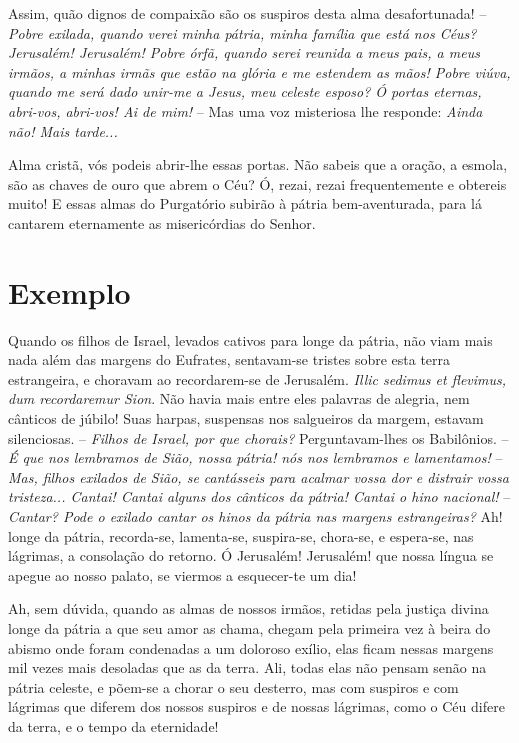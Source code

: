 Assim, quão dignos de compaixão são os suspiros desta alma desafortunada! – \textit{Pobre exilada, quando verei minha pátria, minha família que está nos Céus? Jerusalém! Jerusalém! Pobre órfã, quando serei reunida a meus pais, a meus irmãos, a minhas irmãs que estão na glória e me estendem as mãos! Pobre viúva, quando me será dado unir-me a Jesus, meu celeste esposo? Ó portas eternas, abri-vos, abri-vos! Ai de mim!} – Mas uma voz misteriosa lhe responde: \textit{Ainda não! Mais tarde...}

Alma cristã, vós podeis abrir-lhe essas portas. Não sabeis que a oração, a esmola, são as chaves de ouro que abrem o Céu? Ó, rezai, rezai frequentemente e obtereis muito! E essas almas do Purgatório subirão à pátria bem-aventurada, para lá cantarem eternamente as misericórdias do Senhor.


\section*{Exemplo}

Quando os filhos de Israel, levados cativos para longe da pátria, não viam mais nada além das margens do Eufrates, sentavam-se tristes sobre esta terra estrangeira, e choravam ao recordarem-se de Jerusalém. \textit{Illic sedimus et flevimus, dum recordaremur Sion}. Não havia mais entre eles palavras de alegria, nem cânticos de júbilo! Suas harpas, suspensas nos salgueiros da margem, estavam silenciosas. – \textit{Filhos de Israel, por que chorais?} Perguntavam-lhes os Babilônios. – \textit{É que nos lembramos de Sião, nossa pátria! nós nos lembramos e lamentamos!} – \textit{Mas, filhos exilados de Sião, se cantásseis para acalmar vossa dor e distrair vossa tristeza... Cantai! Cantai alguns dos cânticos da pátria! Cantai o hino nacional!} – \textit{Cantar? Pode o exilado cantar os hinos da pátria nas margens estrangeiras?} Ah! longe da pátria, recorda-se, lamenta-se, suspira-se, chora-se, e espera-se, nas lágrimas, a consolação do retorno. Ó Jerusalém! Jerusalém! que nossa língua se apegue ao nosso palato, se viermos a esquecer-te um dia!

Ah, sem dúvida, quando as almas de nossos irmãos, retidas pela justiça divina longe da pátria a que seu amor as chama, chegam pela primeira vez à beira do abismo onde foram condenadas a um doloroso exílio, elas ficam nessas margens mil vezes mais desoladas que as da terra. Ali, todas elas não pensam senão na pátria celeste, e põem-se a chorar o seu desterro, mas com suspiros e com lágrimas que diferem dos nossos suspiros e de nossas lágrimas, como o Céu difere da terra, e o tempo da eternidade!


